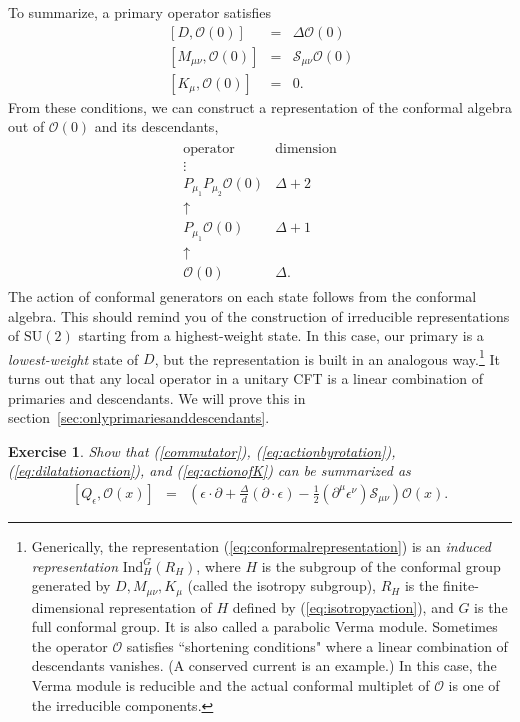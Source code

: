 \documentclass{ws-rv9x6}
\newcommand\be{\begin{eqnarray}}
\newcommand\ee{\end{eqnarray}}
\newcommand\cO{\mathcal{O}}
\newcommand\p[1]{\left(#1\right)}
\newcommand\ptl\partial
\newcommand\e\epsilon
\newcommand\<\langle
\renewcommand\>\rangle
\newcommand\nn{\nonumber}
\renewcommand\.{\cdot}
\newcommand\De{\Delta}
\newcommand\cS{\mathcal{S}}
\newcommand\SU{\mathrm{SU}}
\newtheorem{exercise}{Exercise}[section]
\begin{document}
To summarize, a primary operator satisfies
\be
\label{eq:isotropyaction}
\,[D,\cO(0)] &=& \De\cO(0)\nn\\
\,[M_{\mu\nu},\cO(0)] &=& \cS_{\mu\nu}\cO(0)\nn\\
\,[K_\mu,\cO(0)] &=& 0.
\ee
From these conditions, we can construct a representation of the conformal algebra out of 
$\cO(0)$ and its descendants,
\be
\label{eq:conformalrepresentation}
\begin{array}{c|c}
\textrm{operator} & \textrm{dimension}
\\
\hline
\vdots & \\
P_{\mu_1}P_{\mu_2}\cO(0) & \De+2\\
\uparrow & \\
P_{\mu_1} \cO(0) & \De+1\\
\uparrow &\\
\cO(0) & \De.
\end{array}
\ee
The action of conformal generators on each state follows from the conformal algebra.  This should remind you of the construction of irreducible representations of $\SU(2)$ starting from a highest-weight state.  In this case, our primary is a {\it lowest-weight\/} state of $D$, but the representation is built in an analogous way.\footnote{Generically, the representation (\ref{eq:conformalrepresentation}) is an {\it induced representation} $\mathrm{Ind}^G_H(R_H)$, where $H$ is the subgroup of the conformal group generated by $D,M_{\mu\nu},K_\mu$ (called the isotropy subgroup), $R_H$ is the finite-dimensional representation of $H$ defined by (\ref{eq:isotropyaction}), and $G$ is the full conformal group. It is also called a parabolic Verma module.  Sometimes the operator $\cO$ satisfies ``shortening conditions" where a linear combination of descendants vanishes. (A conserved current is an example.)  In this case, the Verma module is reducible and the actual conformal multiplet of $\cO$ is one of the irreducible components.}  It turns out that any local operator in a unitary CFT is a linear combination of primaries and descendants. We will prove this in section~\ref{sec:onlyprimariesanddescendants}.

\begin{exercise}
Show that (\ref{commutator}), (\ref{eq:actionbyrotation}), (\ref{eq:dilatationaction}), and (\ref{eq:actionofK}) can be summarized as
\be
\label{eq:generatorsummary}
[Q_\e,\cO(x)] &=& \p{\e\.\ptl + \frac{\De}{d}(\ptl\.\e) - \frac 1 2 (\ptl^\mu \e^\nu)\cS_{\mu\nu}}\cO(x).
\ee
\end{exercise}
\end{document}
